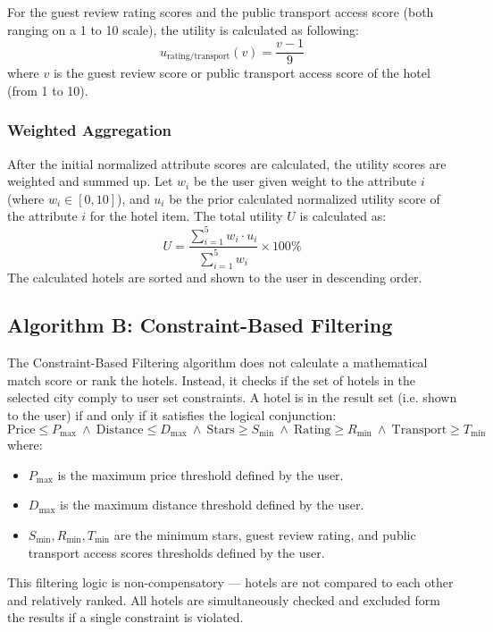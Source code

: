 \documentclass[acmlarge]{acmart}
\begin{document}
For the guest review rating scores and the public transport access score (both ranging on a 1 to 10 scale), the utility is calculated as following:
\begin{equation}\label{eq:norm_rating_transit}
  u_{\text{rating/transport}}(v) = \frac{v - 1}{9}
\end{equation}
where $v$ is the guest review score or public transport access score of the hotel (from 1 to 10).

\subsubsection{Weighted Aggregation}
After the initial normalized attribute scores are calculated, the utility scores are weighted and summed up. Let $w_i$ be the user given weight to the attribute $i$ (where $w_i \in [0, 10]$), and $u_i$ be the prior calculated normalized utility score of the attribute $i$ for the hotel item. The total utility $U$ is calculated as:
\begin{equation}\label{eq:maut}
  U = \frac{\sum_{i=1}^{5} w_i \cdot u_i}{\sum_{i=1}^{5} w_i} \times 100\%
\end{equation}
The calculated hotels are sorted and shown to the user in descending order.

\subsection{Algorithm B: Constraint-Based Filtering}
The Constraint-Based Filtering algorithm does not calculate a mathematical match score or rank the hotels. Instead, it checks if the set of hotels in the selected city comply to user set constraints. A hotel is in the result set (i.e. shown to the user) if and only if it satisfies the logical conjunction:
\begin{equation}\label{eq:filtering}
  \text{Price} \le P_{\max} \ \land \ \text{Distance} \le D_{\max} \ \land \ \text{Stars} \ge S_{\min} \ \land \ \text{Rating} \ge R_{\min} \ \land \ \text{Transport} \ge T_{\min}
\end{equation}
where:
\begin{itemize}
  \item $P_{\max}$ is the maximum price threshold defined by the user.
  \item $D_{\max}$ is the maximum distance threshold defined by the user.
  \item $S_{\min}, R_{\min}, T_{\min}$ are the minimum stars, guest review rating, and public transport access scores thresholds defined by the user.
\end{itemize}
This filtering logic is non-compensatory --- hotels are not compared to each other and relatively ranked. All hotels are simultaneously checked and excluded form the results if a single constraint is violated.
\end{document}
